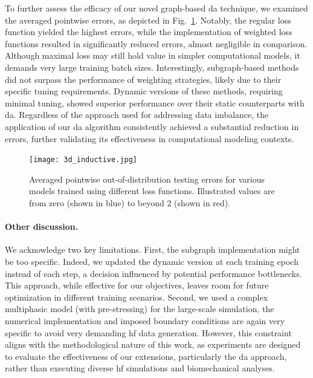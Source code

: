 \documentclass[12pt,a4paper]{report}
\begin{document}
To further assess the efficacy of our novel graph-based \ac{da} technique, we examined the averaged pointwise errors, as depicted in Fig.~\ref{fig:3d_inductive}. Notably, the regular loss function yielded the highest errors, while the implementation of weighted loss functions resulted in significantly reduced errors, almost negligible in comparison. Although maximal loss may still hold value in simpler computational models, it demands very large training batch sizes. Interestingly, subgraph-based methods did not surpass the performance of weighting strategies, likely due to their specific tuning requirements. Dynamic versions of these methods, requiring minimal tuning, showed superior performance over their static counterparts with \ac{da}. Regardless of the approach used for addressing data imbalance, the application of our \ac{da} algorithm consistently achieved a substantial reduction in errors, further validating its effectiveness in computational modeling contexts.
%
\begin{figure}\centering
\texttt{[image: 3d\_inductive.jpg]}
\caption{Averaged pointwise out-of-distribution testing errors for various models trained using different loss functions. Illustrated values are from zero (shown in blue) to beyond 2 (shown in red).}\label{fig:3d_inductive}
\end{figure}

\paragraph{Other discussion.} We acknowledge two key limitations. First, the subgraph implementation might be too specific. Indeed, we updated the dynamic version at each training epoch instead of each step, a decision influenced by potential performance bottlenecks. This approach, while effective for our objectives, leaves room for future optimization in different training scenarios. Second, we used a complex multiphasic model (with pre-stressing) for the large-scale simulation, the numerical implementation and imposed boundary conditions are again very specific to avoid very demanding \ac{hf} data generation. However, this constraint aligns with the methodological nature of this work, as experiments are designed to evaluate the effectiveness of our extensions, particularly the \ac{da} approach, rather than executing diverse \ac{hf} simulations and biomechanical analyses.
\end{document}

